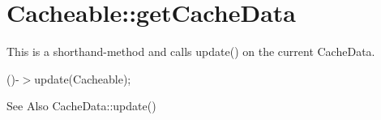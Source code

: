 \hypertarget{_cacheable_1_1get_cache_data-example}{\section{Cacheable\-::get\-Cache\-Data}
}
This is a shorthand-\/method and calls update() on the current Cache\-Data.

()-\/$>$update(\-Cacheable); \begin{DoxySeeAlso}{See Also}
Cache\-Data\-::update()
\end{DoxySeeAlso}

\begin{DoxyCodeInclude}
\end{DoxyCodeInclude}
 